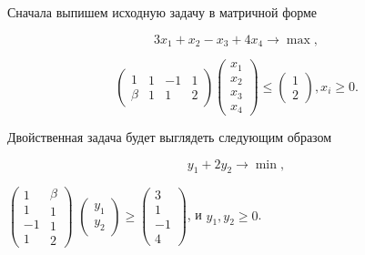 \begin{solution}
Сначала выпишем исходную задачу в матричной форме


\[3x_{1} +x_{2} -x_{3} +4x_{4} \to \max ,\] 

\[\left(\begin{array}{c} {1} \\ {\beta } \end{array}\begin{array}{c} {1} \\ {1} \end{array}\begin{array}{c} {-1} \\ {1} \end{array}\begin{array}{c} {1} \\ {2} \end{array}\right)\left(\begin{array}{c} {x_{1} } \\ {x_{2} } \\ {x_{3} } \\ {x_{4} } \end{array}\right)\le \left(\begin{array}{c} {1} \\ {2} \end{array}\right), x_{i} \ge 0.\] 

Двойственная задача будет выглядеть следующим образом

\[y_{1} +2y_{2} \to \min ,\] 

$\left(\begin{array}{c} {1} \\ {1} \\ {-1} \\ {1} \end{array}\begin{array}{c} {\beta } \\ {1} \\ {1} \\ {2} \end{array}\right)$
$\left(\begin{array}{c} {y_{1} } \\ {y_{2} } \end{array}\right)\ge \left(\begin{array}{c} {3} \\ {1} \\ {-1} \\ {4} \end{array}\right)$, и $y_{1} , y_{2} \ge 0$.


\end{solution}
